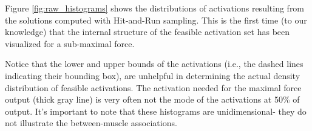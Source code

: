 Figure \ref{fig:raw_histograms} shows the distributions of activations resulting from the solutions computed with Hit-and-Run sampling.
This is the first time (to our knowledge) that the internal structure of the feasible activation set has been visualized for a sub-maximal force.

Notice that the lower and upper bounds of the activations (i.e., the dashed lines indicating their bounding box), are unhelpful in determining the actual density distribution of feasible activations.
The activation needed for the maximal force output (thick gray line) is very often not the mode of the activations at 50\% of output.
It's important to note that these histograms are unidimensional- they do not illustrate the between-muscle associations.

